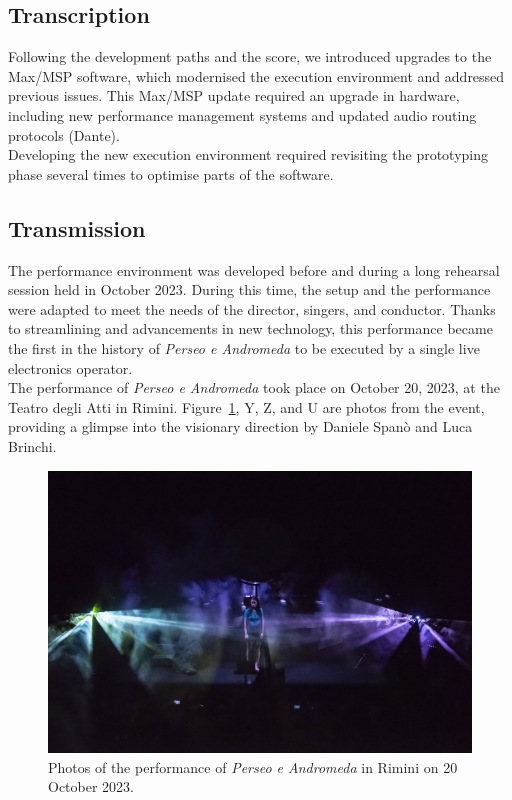 \subsection*{Transcription}
Following the development paths and the score, we introduced upgrades to the Max/MSP software, which modernised the execution environment and addressed previous issues. This Max/MSP update required an upgrade in hardware, including new performance management systems and updated audio routing protocols (Dante).\\
Developing the new execution environment required revisiting the prototyping phase several times to optimise parts of the software.

\subsection*{Transmission}
The performance environment was developed before and during a long rehearsal session held in October 2023. During this time, the setup and the performance were adapted to meet the needs of the director, singers, and conductor. Thanks to streamlining and advancements in new technology, this performance became the first in the history of \textit{Perseo e Andromeda} to be executed by a single live electronics operator.\\
The performance of \textit{Perseo e Andromeda} took place on October 20, 2023, at the Teatro degli Atti in Rimini. Figure~\ref{fig:ac-perseo-ph03}, Y, Z, and U are photos from the event, providing a glimpse into the visionary direction by Daniele Spanò and Luca Brinchi.

\begin{figure}[!h]
    \centering
    \includegraphics[width=\linewidth]{chapters/appendix/c/image/figc-perseo-ph003.jpg}
    \caption{Photos of the performance of \textit{Perseo e Andromeda} in Rimini on 20 October 2023.}
    \label{fig:ac-perseo-ph03}
\end{figure}

